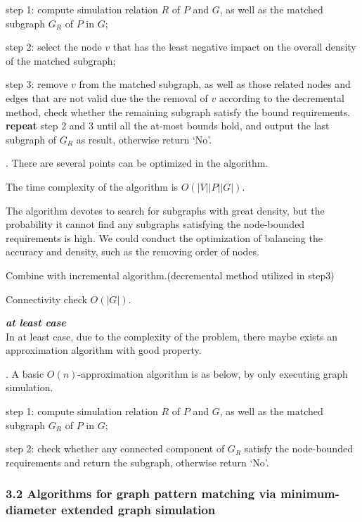 \be
\item step 1: compute simulation relation $R$ of $P$ and $G$, as well as the matched subgraph $G_R$ of $P$ in $G$;
\item step 2: select the node $v$ that has the least negative impact on the overall density of the matched subgraph;
\item step 3: remove $v$ from the matched subgraph, as well as those related nodes and edges that are not valid due the the removal of $v$ according to the decremental method, check whether the remaining subgraph satisfy the bound requirements.\\
    \textbf{repeat} step 2 and 3 until all the at-most bounds hold, and output the last subgraph of $G_R$ as result, otherwise return `No'.
\ee

.  There are several points can be optimized in the algorithm.
\be
\item [(1)] The time complexity of the algorithm is $O(|V||P||G|)$.
\item [(2)] The algorithm devotes to search for subgraphs with great density, but the probability it cannot find any subgraphs satisfying the node-bounded requirements is high. We could conduct the optimization of balancing the accuracy and density, such as the removing order of nodes.
\item [(3)] Combine with incremental algorithm.(decremental method utilized in step3)
\item [(4)] Connectivity check $O(|G|)$.
\ee

\textbf{\emph{at least case}}\\
In at least case, due to the complexity of the problem, there maybe exists an approximation algorithm with good property.

.  A basic $O(n)$-approximation algorithm is as below, by only executing graph simulation.
\be
\item step 1: compute simulation relation $R$ of $P$ and $G$, as well as the matched subgraph $G_R$ of $P$ in $G$;
\item step 2: check whether any connected component of $G_R$ satisfy the node-bounded requirements and return the subgraph, otherwise return `No'.
\ee

\subsubsection*{3.2 Algorithms for graph pattern matching via minimum-diameter extended graph simulation}


